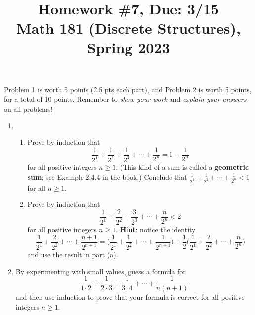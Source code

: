 \documentclass[11pt]{article}
\title{Homework \#7, Due: 3/15 \\Math 181 (Discrete Structures), Spring 2023}
\date{}
\begin{document}
\maketitle

\thispagestyle{empty}

\vspace{-1cm}

Problem 1 is worth 5 points (2.5 pts each part), and Problem 2 is worth 5 points, for a total of 10 points. Remember to \emph{show your work} and \emph{explain your answers} on all problems!

\begin{enumerate}
\item \begin{enumerate}
\item Prove by induction that
\[\frac{1}{2^1} + \frac{1}{2^2} + \frac{1}{2^3} + \cdots + \frac{1}{2^n} = 1- \frac{1}{2^n}\]
for all positive integers $n \geq 1$. (This kind of a sum is called a {\bf geometric sum}; see Example 2.4.4 in the book.) Conclude that $\frac{1}{2^1} + \frac{1}{2^2} + \cdots + \frac{1}{2^n}  < 1$ for all $n \geq 1$.
\item Prove by induction that
\[\frac{1}{2^1} + \frac{2}{2^2} + \frac{3}{2^3} + \cdots + \frac{n}{2^n} < 2\]
for all positive integers $n \geq 1$. {\bf Hint}: notice the identity
\[\frac{1}{2^1} + \frac{2}{2^2} + \cdots + \frac{n+1}{2^{n+1}} = \big ( \frac{1}{2^1} + \frac{1}{2^2} + \cdots + \frac{1}{2^{n+1}} \big ) + \frac{1}{2} \big(\frac{1}{2^1} + \frac{2}{2^2} + \cdots + \frac{n}{2^n}\big) \]
and use the result in part (a).
\end{enumerate}
\item By experimenting with small values, guess a formula for
\[\frac{1}{1\cdot 2} + \frac{1}{2 \cdot 3} + \frac{1}{3 \cdot 4} + \cdots + \frac{1}{n (n+1)}\]
and then use induction to prove that your formula is correct for all positive integers $n \geq 1$.
\end{enumerate}
\end{document}
